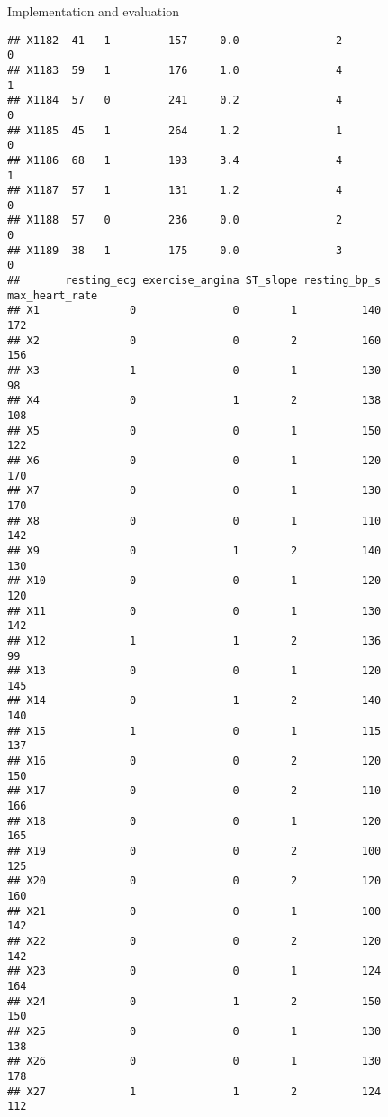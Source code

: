 \documentclass[
  ignorenonframetext,
]{beamer}
\begin{document}
\begin{frame}[fragile]{Implementation and evaluation}
\begin{verbatim}
## X1182  41   1         157     0.0               2                   0
## X1183  59   1         176     1.0               4                   1
## X1184  57   0         241     0.2               4                   0
## X1185  45   1         264     1.2               1                   0
## X1186  68   1         193     3.4               4                   1
## X1187  57   1         131     1.2               4                   0
## X1188  57   0         236     0.0               2                   0
## X1189  38   1         175     0.0               3                   0
##       resting_ecg exercise_angina ST_slope resting_bp_s max_heart_rate
## X1              0               0        1          140            172
## X2              0               0        2          160            156
## X3              1               0        1          130             98
## X4              0               1        2          138            108
## X5              0               0        1          150            122
## X6              0               0        1          120            170
## X7              0               0        1          130            170
## X8              0               0        1          110            142
## X9              0               1        2          140            130
## X10             0               0        1          120            120
## X11             0               0        1          130            142
## X12             1               1        2          136             99
## X13             0               0        1          120            145
## X14             0               1        2          140            140
## X15             1               0        1          115            137
## X16             0               0        2          120            150
## X17             0               0        2          110            166
## X18             0               0        1          120            165
## X19             0               0        2          100            125
## X20             0               0        2          120            160
## X21             0               0        1          100            142
## X22             0               0        2          120            142
## X23             0               0        1          124            164
## X24             0               1        2          150            150
## X25             0               0        1          130            138
## X26             0               0        1          130            178
## X27             1               1        2          124            112

\end{verbatim}
\end{frame}
\end{document}
